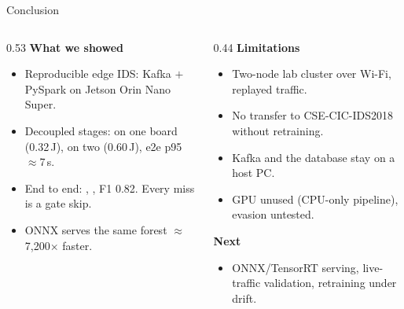 \documentclass[aspectratio=169, 11pt]{beamer}
\begin{document}
\begin{frame}{Conclusion}
  \begin{columns}[T]
    \begin{column}{0.53\textwidth}
      \textbf{What we showed}
      \begin{itemize}\small
        \item Reproducible edge IDS: Kafka $+$ PySpark on Jetson Orin Nano Super.
        \item Decoupled stages:  on one
              board (0.32\,J),  on two (0.60\,J), e2e p95
              $\approx$7\,s.
        \item End to end: , , F1 0.82.
              Every miss is a gate skip.
        \item ONNX serves the same forest $\approx$7{,}200$\times$ faster.
      \end{itemize}
    \end{column}
    \begin{column}{0.44\textwidth}
      \textbf{Limitations}
      \begin{itemize}\footnotesize
        \item Two-node lab cluster over Wi-Fi, replayed traffic.
        \item No transfer to CSE-CIC-IDS2018 without retraining.
        \item Kafka and the database stay on a host PC.
        \item GPU unused (CPU-only pipeline), evasion untested.
      \end{itemize}
      \textbf{Next}
      \begin{itemize}\footnotesize
        \item ONNX/TensorRT serving, live-traffic validation, retraining under drift.
      \end{itemize}
    \end{column}
  \end{columns}
  \vfill
  \centering
\end{frame}
\end{document}
